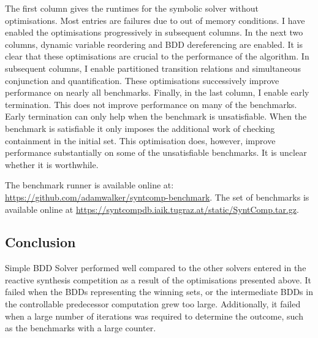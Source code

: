 The first column gives the runtimes for the symbolic solver without optimisations. Most entries are failures due to out of memory conditions. I have enabled the optimisations progressively in subsequent columns. In the next two columns, dynamic variable reordering and BDD dereferencing are enabled. It is clear that these optimisations are crucial to the performance of the algorithm. In subsequent columns, I enable partitioned transition relations and simultaneous conjunction and quantification. These optimisations successively improve performance on nearly all benchmarks. Finally, in the last column, I enable early termination. This does not improve performance on many of the benchmarks. Early termination can only help when the benchmark is unsatisfiable. When the benchmark is satisfiable it only imposes the additional work of checking containment in the initial set. This optimisation does, however, improve performance substantially on some of the unsatisfiable benchmarks. It is unclear whether it is worthwhile.

The benchmark runner is available online at: \url{https://github.com/adamwalker/syntcomp-benchmark}. The set of benchmarks is available online at \url{https://syntcompdb.iaik.tugraz.at/static/SyntComp.tar.gz}.

\subsection{Conclusion}
Simple BDD Solver performed well compared to the other solvers entered in the reactive synthesis competition as a result of the optimisations presented above. It failed when the BDDs representing the winning sets, or the intermediate BDDs in the controllable predecessor computation grew too large. Additionally, it failed when a large number of iterations was required to determine the outcome, such as the benchmarks with a large counter. 

